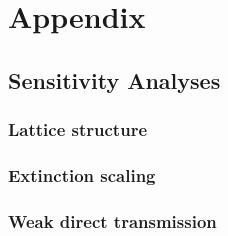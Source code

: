 \documentclass{svjour3}
\begin{document}
\clearpage

\section{Appendix}

\subsection{Sensitivity Analyses}

\subsubsection{Lattice structure}

\subsubsection{Extinction scaling}

\subsubsection{Weak direct transmission}


     
\end{document}
